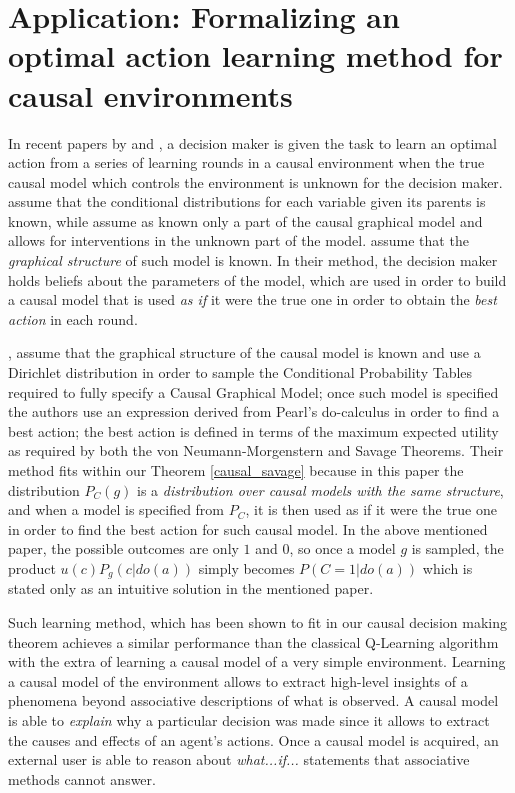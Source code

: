 \documentclass[review]{elsarticle}
\begin{document}
\section{Application: Formalizing an optimal action learning method for causal environments}
\label{optimal_action}
In recent papers by \cite{lattimoreNIPS2016,sen2017identifying} and \cite{gonzalez2018playing}, a decision maker is given the task to learn an optimal action from a series of learning rounds in a causal environment when the true causal model which controls the environment is unknown for the decision maker. \cite{lattimoreNIPS2016} assume that the conditional distributions for each variable given its parents is known, while \cite{sen2017identifying} assume as known only a part of the causal graphical model and allows for interventions in the unknown part of the model. \cite{gonzalez2018playing}  assume that the \textit{graphical structure} of such model is known. In their method, the decision maker holds beliefs about the parameters of the model, which are used in order to build a causal model that is used \textit{as if} it were the true one in order to obtain the \textit{best action} in each round.

\cite{gonzalez2018playing}, assume that the graphical structure of the causal model is known and use a Dirichlet distribution in order to sample the Conditional Probability Tables required to fully specify a Causal Graphical Model; once such model is specified the authors use an expression derived from Pearl's do-calculus in order to find a best action; the best action is defined in terms of the maximum expected utility as required by both the von Neumann-Morgenstern and Savage Theorems. Their method fits within our Theorem \ref{causal_savage} because in this paper the distribution $P_C(g)$ is a \textit{distribution over causal models with the same structure}, and when a model is specified from $P_C$, it is then used as if it were the true one in order to find the best action for such causal model. In the above mentioned paper, the possible outcomes are only $1$ and $0$, so once a model $g$ is sampled, the product $u(c)P_g(c|do(a))$ simply becomes $P(C=1 | do(a))$ which is stated only as an intuitive solution in the mentioned paper. 

Such learning method, which has been shown to fit in our causal decision making theorem achieves a similar performance than the classical Q-Learning algorithm with the extra of learning a causal model of a very simple environment. Learning a causal model of the environment allows to extract high-level insights of a phenomena beyond associative descriptions of what is observed. A causal model is able to \textit{explain} why a particular decision was made since it allows to extract the causes and effects of an agent's actions. Once a causal model is acquired, an external user is able to reason about \textit{what...if...} statements that associative methods cannot answer.  
\end{document}
